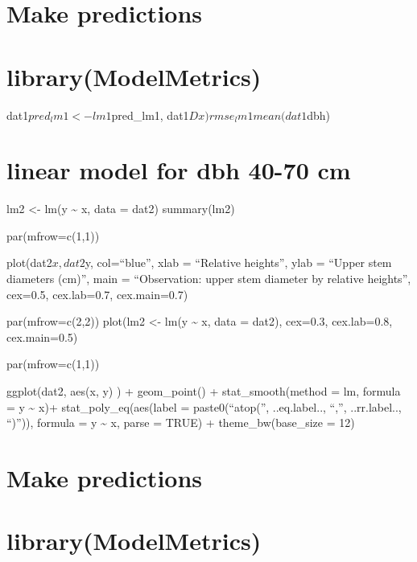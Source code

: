 \documentclass[
]{article}
\begin{document}
\hypertarget{make-predictions}{%
\section{Make predictions}\label{make-predictions}}

\hypertarget{librarymodelmetrics}{%
\section{library(ModelMetrics)}\label{librarymodelmetrics}}

dat1\(pred_lm1 <- lm1 %
\)pred\_lm1, dat1\(Dx) rmse_lm1 mean(dat1\)dbh)

\hypertarget{linear-model-for-dbh-40-70-cm}{%
\section{linear model for dbh 40-70
cm}\label{linear-model-for-dbh-40-70-cm}}

lm2 \textless- lm(y \textasciitilde{} x, data = dat2) summary(lm2)

par(mfrow=c(1,1))

plot(dat2\(x, dat2\)y, col=``blue'', xlab = ``Relative heights'', ylab =
``Upper stem diameters (cm)'', main = ``Observation: upper stem diameter
by relative heights'', cex=0.5, cex.lab=0.7, cex.main=0.7)

par(mfrow=c(2,2)) plot(lm2 \textless- lm(y \textasciitilde{} x, data =
dat2), cex=0.3, cex.lab=0.8, cex.main=0.5)

par(mfrow=c(1,1))

ggplot(dat2, aes(x, y) ) + geom\_point() + stat\_smooth(method = lm,
formula = y \textasciitilde{} x)+ stat\_poly\_eq(aes(label =
paste0(``atop('', ..eq.label.., ``,'', ..rr.label.., ``)'')), formula =
y \textasciitilde{} x, parse = TRUE) + theme\_bw(base\_size = 12)

\hypertarget{make-predictions-1}{%
\section{Make predictions}\label{make-predictions-1}}

\hypertarget{librarymodelmetrics-1}{%
\section{library(ModelMetrics)}\label{librarymodelmetrics-1}}
\end{document}
